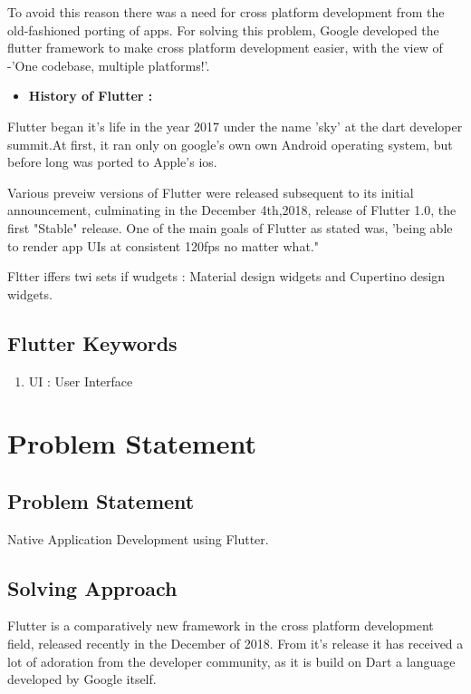 \documentclass[11pt,a4paper,oneside,openright]{report}
\begin{document}
{{\hspace{0.2in} To avoid this reason there was a need for cross platform development from the old-fashioned porting of apps. For solving this problem, Google developed the flutter framework to make cross platform development easier, with the view of -'One codebase, multiple platforms!'.
			

\begin{itemize}

\item {\bf History of Flutter : }
\end{itemize}
\hspace{0.2in} Flutter began it's life in the year 2017 under the name 'sky' at the dart developer summit.At first, it ran only on google's own own Android operating system, but before long was ported to Apple's ios. 

\hspace{0.2in} Various preveiw versions of Flutter were released subsequent to its initial announcement, culminating in the December  4th,2018, release of Flutter 1.0, the first "Stable" release. One of the main goals of Flutter as stated was, 'being able to render app UIs at consistent 120fps no matter what."

\hspace{0.2in} Fltter iffers twi sets if wudgets : Material design widgets and Cupertino design widgets.

\section{Flutter Keywords}
 \begin{enumerate}
 \item UI : User Interface
 \end{enumerate}


\chapter{Problem Statement}\label{chap:project outline}

\section{Problem Statement}
 Native Application Development using Flutter.
\section{Solving Approach}
	Flutter is a comparatively new framework in the cross platform development field, released recently in the December of 2018. From it's release it has received a lot of adoration from the developer community, as it is build on Dart a language developed by Google itself.  

}}
\end{document}
